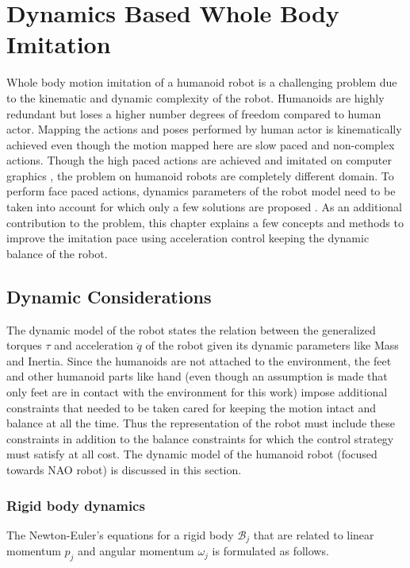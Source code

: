 \chapter{Dynamics Based Whole Body Imitation}
\label{chapter-3}

Whole body motion imitation of a humanoid robot is a challenging problem due to the kinematic and dynamic complexity of the robot. Humanoids are highly
redundant but loses a higher number degrees of freedom compared to human actor. Mapping the actions and poses performed by human actor is kinematically 
achieved \cite{sakka:hal-01054887,mukherjee2015inverse} even though the motion mapped here are slow paced and non-complex actions. Though the high paced
actions are achieved and imitated on computer graphics \cite{brown2013control}, the problem on humanoid robots are completely different domain. To perform face paced actions, 
dynamics parameters of the robot model need to be taken into account for which only a few solutions are proposed \cite{ramosponce, gucci:hal-01895145}. 
As an additional contribution to the problem, this chapter explains a few concepts and methods to improve the imitation pace using acceleration control 
keeping the dynamic balance of the robot.

\section{Dynamic Considerations}
\label{dynamic-consideration}

The dynamic model of the robot states the relation between the generalized torques $\tau$ and acceleration $\ddot{q}$ of the robot given its dynamic 
parameters like Mass and Inertia. Since the humanoids are not attached to the environment, the feet and other humanoid parts like hand (even though 
an assumption is made that only feet are in contact with the environment for this work) impose additional constraints that needed to be taken cared
for keeping the motion intact and balance at all the time. Thus the representation of the robot must include these constraints in addition to the 
balance constraints for which the control strategy must satisfy at all cost. The dynamic model of the humanoid robot (focused towards NAO robot) 
is discussed in this section.

\subsection{Rigid body dynamics}
\label{rigid-body-dynamics}
The Newton-Euler's equations for a rigid body $\mathcal{B}_j$ that are related to linear momentum $p_j$ and angular momentum $\omega_j$ is formulated as follows.

